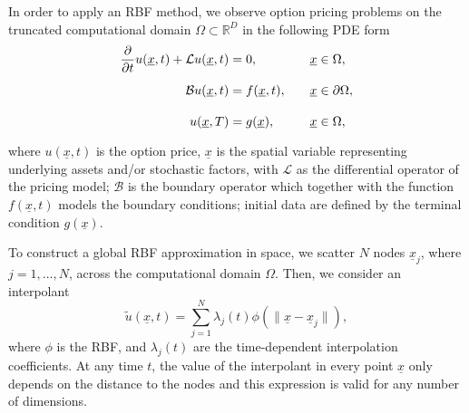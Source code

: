 \documentclass{UUThesisTemplate}
\begin{document}
\par
In order to apply an RBF method, we observe option pricing problems on the truncated computational domain $\Omega\subset \mathbb{R}^{D}$ in the following PDE form
\begin{alignat}{2}
\frac{\partial}{\partial t}u(\underline{x},t) + \mathcal{L}u(\underline{x},t) &= 0, \quad &&\underline{x} \in \Omega, \label{eqPDE} \\
{\color{white} \frac{\partial}{\partial t}} \mathcal{B}u(\underline{x},t) &= f(\underline{x},t), \quad &&\underline{x} \in \partial \Omega, \label{eqBC} \\
{\color{white} \frac{\partial}{\partial t}} u(\underline{x},T) &= g(\underline{x}), \quad &&\underline{x} \in \Omega, \label{eqTC}
\end{alignat}
where $u(\underline{x},t)$ is the option price, $\underline{x}$ is the spatial variable representing underlying assets and/or stochastic factors, with $\mathcal{L}$ as the differential operator of the pricing model; $\mathcal{B}$ is the boundary operator which together with the function $f(\underline{x},t)$ models the boundary conditions; initial data are defined by the terminal condition $g(\underline{x})$. 

\par
To construct a global RBF approximation in space, we scatter $N$ nodes $\underline{x}_j$, where $j=1,\ldots,N$, across the computational domain $\Omega$. Then, we consider an interpolant
\begin{equation}
\label{eq:RBFint}
	\tilde{u}(\underline{x},t) = \sum_{j=1}^N \lambda_j(t) \phi(\|\underline{x}-\underline{x}_j\|),
\end{equation}
where $\phi$ is the RBF, and $\lambda_j(t)$ are the time-dependent interpolation coefficients. At any time $t$, the value of the interpolant in every point $\underline{x}$ only depends on the distance to the nodes and this expression is valid for any number of dimensions. 
\end{document}
